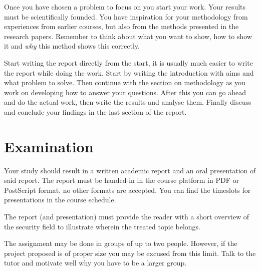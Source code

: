 \documentclass[a4paper]{article}
\begin{document}
Once you have chosen a problem to focus on you start your work.
Your results must be scientifically founded.
You have inspiration for your methodology from experiences from earlier 
courses, but also from the methods presented in the research papers.
Remember to think about what you want to show, how to show it and \emph{why} 
this method shows this correctly.

Start writing the report directly from the start, it is usually much easier to 
write the report while doing the work.
Start by writing the introduction with aims and what problem to solve.
Then continue with the section on methodology as you work on developing how to 
answer your questions.
After this you can go ahead and do the actual work, then write the results and 
analyse them.
Finally discuss and conclude your findings in the last section of the report.


\section{Examination}%
\label{sec:exam}

Your study should result in a written academic report and an oral presentation 
of said report.
The report must be handed-in in the course platform in PDF or PostScript 
format, no other formats are accepted.
You can find the timeslots for presentations in the course schedule.

The report (and presentation) must provide the reader with a short overview of 
the security field to illustrate wherein the treated topic belongs.

The assignment may be done in groups of up to two people.
However, if the project proposed is of proper size you may be excused from this 
limit.
Talk to the tutor and motivate well why you have to be a larger group.


\printbibliography{}
\end{document}
